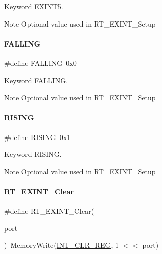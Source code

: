 Keyword E\+X\+I\+N\+T5. 

\begin{DoxyNote}{Note}
Optional value used in R\+T\+\_\+\+E\+X\+I\+N\+T\+\_\+\+Setup 
\end{DoxyNote}
\mbox{\label{a00011_ac00eb6fc2047dc399280f31b0c5f4472}} 
\paragraph{\texorpdfstring{F\+A\+L\+L\+I\+NG}{FALLING}}
{\footnotesize\ttfamily \#define F\+A\+L\+L\+I\+NG~0x0}



Keyword F\+A\+L\+L\+I\+NG. 

\begin{DoxyNote}{Note}
Optional value used in R\+T\+\_\+\+E\+X\+I\+N\+T\+\_\+\+Setup 
\end{DoxyNote}
\mbox{\label{a00011_aeea2b49478f3b13faedba764985c6e96}} 
\paragraph{\texorpdfstring{R\+I\+S\+I\+NG}{RISING}}
{\footnotesize\ttfamily \#define R\+I\+S\+I\+NG~0x1}



Keyword R\+I\+S\+I\+NG. 

\begin{DoxyNote}{Note}
Optional value used in R\+T\+\_\+\+E\+X\+I\+N\+T\+\_\+\+Setup 
\end{DoxyNote}
\mbox{\label{a00011_a1bebef46f3eb19ed0c71deb174a4bbaf}} 
\paragraph{\texorpdfstring{R\+T\+\_\+\+E\+X\+I\+N\+T\+\_\+\+Clear}{RT\_EXINT\_Clear}}
{\footnotesize\ttfamily \#define R\+T\+\_\+\+E\+X\+I\+N\+T\+\_\+\+Clear(\begin{DoxyParamCaption}\item[{}]{port }\end{DoxyParamCaption})~Memory\+Write(\mbox{\hyperlink{a00020_adadaa0ab1ebbd7ba9b70dfd24c3ed44da33cabaff7369092ec0e29dd2ffb0cb3d}{I\+N\+T\+\_\+\+C\+L\+R\+\_\+\+R\+EG}}, 1 $<$$<$ port)}



